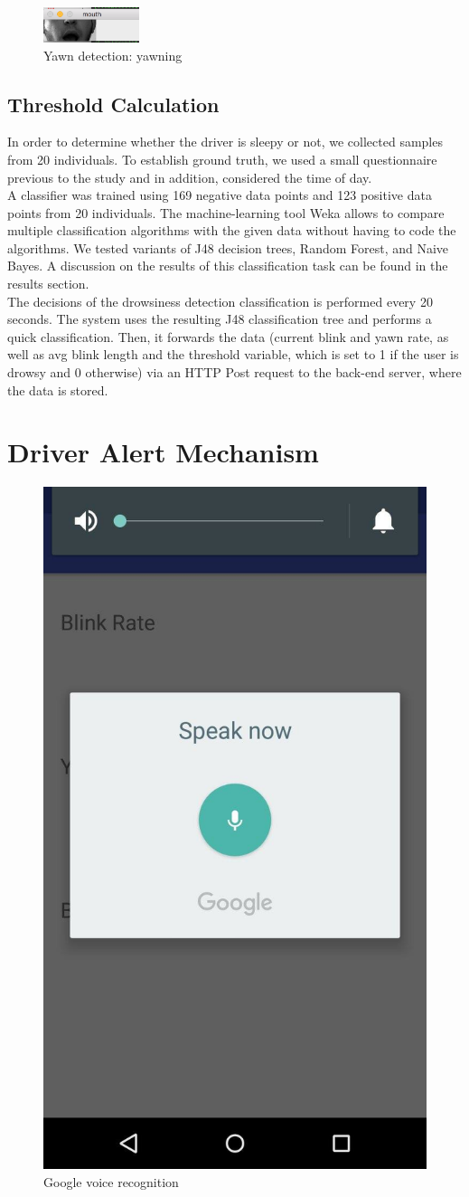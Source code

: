 \documentclass[twocolumn]{article}
\begin{document}
\begin{figure}[H]
\centering
\includegraphics[width=0.25\textwidth]{./open_mouth.png}
\caption{Yawn detection: yawning}
\label{fig:yawn}
\end{figure}

\subsection{Threshold Calculation}
In order to determine whether the driver is sleepy or not, we collected samples from 20 individuals. To establish ground truth, we used a small questionnaire previous to the study and in addition, considered the time of day. \\
A classifier was trained using 169 negative data points and 123 positive data points from 20 individuals. The machine-learning tool Weka allows to compare multiple classification algorithms with the given data without having to code the algorithms. We tested variants of J48 decision trees, Random Forest, and Naive Bayes.  A discussion on the results of this classification task can be found in the results section. \\
The decisions of the drowsiness detection classification is performed every 20 seconds. The system uses the resulting J48 classification tree and performs a quick classification. Then, it forwards the data (current blink and yawn rate, as well as avg blink length and the threshold variable, which is set to 1 if the user is drowsy and 0 otherwise) via an HTTP Post request to the back-end server, where the data is stored. 

\section{Driver Alert Mechanism}
\begin{figure}
\centering
  \includegraphics[width=.5\linewidth]{speaknow.jpg}
  \caption{Google voice recognition}
  \label{fig:voice}
\end{figure}
\end{document}
